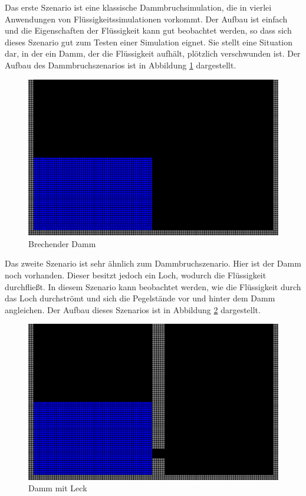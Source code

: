 \documentclass{scrreprt}
\begin{document}
Das erste Szenario ist eine klassische Dammbruchsimulation, die in vierlei Anwendungen von Flüssigkeitssimulationen vorkommt.
Der Aufbau ist einfach und die Eigenschaften der Flüssigkeit kann gut beobachtet werden, so dass sich dieses Szenario gut zum Testen einer Simulation eignet.
Sie stellt eine Situation dar, in der ein Damm, der die Flüssigkeit aufhält, plötzlich verschwunden ist.
Der Aufbau des Dammbruchszenarios ist in Abbildung \ref{image:breaking_dam} dargestellt.
\begin{figure}[htb]
    \includegraphics[width=\textwidth]{Dammbruch.png}
    \caption{Brechender Damm}
    \label{image:breaking_dam}
\end{figure}

Das zweite Szenario ist sehr ähnlich zum Dammbruchszenario. Hier ist der Damm noch vorhanden. Dieser besitzt jedoch ein Loch, wodurch die Flüssigkeit durchfließt.
In diesem Szenario kann beobachtet werden, wie die Flüssigkeit durch das Loch durchströmt und sich die Pegelstände vor und hinter dem Damm angleichen.
Der Aufbau dieses Szenarios ist in Abbildung \ref{image:leaking_dam} dargestellt.
\begin{figure}[htb]
    \includegraphics[width=\textwidth]{Dammleck.png}
    \caption{Damm mit Leck}
    \label{image:leaking_dam}
\end{figure}
\end{document}
